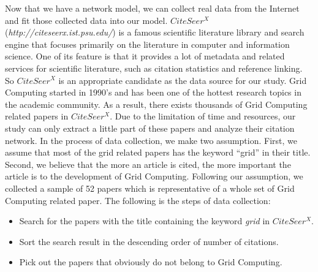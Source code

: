 Now that we have a network model, we can collect real data  from the Internet and fit those collected data into our model. 
$CiteSeer^X$ ({\em http://citeseerx.ist.psu.edu/}) is a famous scientific literature library and search engine that focuses primarily on the literature in computer and information science. One of its feature is that it provides a lot of metadata and related services for scientific literature, such as citation statistics and reference linking. So $CiteSeer^X$ is an appropriate candidate as the data source for our study. Grid Computing started in 1990's and has been one of the hottest research topics in the academic community.  As a result, there exists thousands of Grid Computing related papers in $CiteSeer^X$. Due to the limitation of time and resources, our study can only extract a little part of these papers and analyze their citation network. In the process of data collection, we make two assumption. First, we assume that most of the grid related papers has the keyword ``grid'' in their title. Second, we believe that the more an article is cited, the more important the article is to the development of Grid Computing. Following our assumption, we collected a sample of 52 papers which is representative of a whole set of Grid Computing related paper.  The following is the steps of data collection:
\begin{itemize}
\item Search for the papers with the title containing the keyword {\em grid} in $CiteSeer^X$. 
\item Sort the search result in the descending order of number of citations. 
\item Pick out the papers that obviously do not belong to Grid Computing. 
\end{itemize}  


